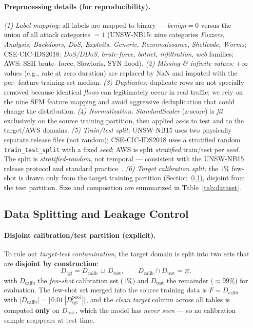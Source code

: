 \documentclass[preprint,12pt,authoryear]{elsarticle}
\begin{document}
\paragraph{Preprocessing details (for reproducibility).} \emph{(1) Label mapping:}
all labels are mapped to binary --- \emph{benign}$=0$ versus the union of all attack
categories $=1$ (UNSW-NB15: nine categories \emph{Fuzzers, Analysis, Backdoors,
DoS, Exploits, Generic, Reconnaissance, Shellcode, Worms}; CSE-CIC-IDS2018:
\emph{DoS/DDoS, brute-force, botnet, infiltration, web} families; AWS: SSH brute-
force, Slowloris, SYN flood). \emph{(2) Missing \& infinite values:} $\pm\infty$
values (e.g., rate at zero duration) are replaced by NaN and imputed with the per-
feature training-set median. \emph{(3) Duplicates:} duplicate rows are not
specially removed because identical \emph{flows} can legitimately occur in real
traffic; we rely on the nine SFM feature mapping and avoid aggressive deduplication
that could change the distribution. \emph{(4) Normalization:} \emph{StandardScaler}
(z-score) is \emph{fit} exclusively on the source training partition, then applied
as-is to test and to the target/AWS domains. \emph{(5) Train/test split:} UNSW-NB15
uses two physically separate release files (not random); CSE-CIC-IDS2018 uses a
stratified random \texttt{train\_test\_split} with a fixed \emph{seed}; AWS is split
\emph{stratified} train/test per \emph{seed}. The split is \emph{stratified-random},
not temporal --- consistent with the UNSW-NB15 release protocol and standard
practice~\citep{kohavi}. \emph{(6) Target calibration split:} the $1\%$ few-shot is
drawn only from the target training partition (Section~\ref{sec:split}), disjoint
from the test partition. Size and composition are summarized in
Table~\ref{tab:dataset}.

\subsection{Data Splitting and Leakage Control}
\label{sec:split}
\paragraph{Disjoint calibration/test partition (explicit).} To rule out
\emph{target-test contamination}, the target domain is split into two sets that are
\textbf{disjoint by construction}:
\begin{equation}
D_{\text{tgt}} = D_{\text{calib}} \,\sqcup\, D_{\text{test}}, \qquad
D_{\text{calib}} \cap D_{\text{test}} = \varnothing,
\end{equation}
with $D_{\text{calib}}$ the \emph{few-shot} calibration set ($1\%$) and
$D_{\text{test}}$ the remainder ($\approx 99\%$) for evaluation. The few-shot set
merged into the source training data is $F = D_{\text{calib}}$ with
$|D_{\text{calib}}| = \lceil 0.01\,|D_{\text{tgt}}^{\text{pool}}| \rceil$, and the
\emph{clean target} column across all tables is computed \textbf{only} on
$D_{\text{test}}$, which the model has \emph{never seen} --- so no calibration
sample reappears at test time.
\end{document}
